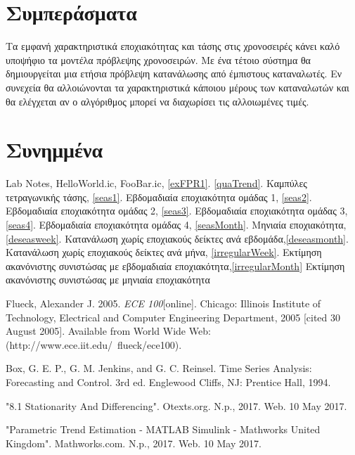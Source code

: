 \documentclass[a4paper, 11pt]{article}
\begin{document}
\section{Συμπεράσματα}
Τα εμφανή χαρακτηριστικά εποχιακότητας και τάσης στις χρονοσειρές κάνει καλό υποψήφιο τα μοντέλα πρόβλεψης χρονοσειρών. Με ένα τέτοιο σύστημα θα δημιουργείται μια ετήσια πρόβλεψη κατανάλωσης από έμπιστους καταναλωτές. Εν συνεχεία θα αλλοιώνονται τα χαρακτηριστικά κάποιου μέρους των καταναλωτών και θα ελέγχεται αν ο αλγόριθμος μπορεί να διαχωρίσει τις αλλοιωμένες τιμές.

\section*{Συνημμένα}
\ifx
Lab Notes, HelloWorld.ic, FooBar.ic,
\ref{exFPR1}.
\fi %
\ref{quaTrend}. Καμπύλες τετραγωνικής τάσης, \ref{seas1}. Εβδομαδιαία εποχιακότητα ομάδας 1, \ref{seas2}. Εβδομαδιαία εποχιακότητα ομάδας 2, \ref{seas3}. Εβδομαδιαία εποχιακότητα ομάδας 3, \ref{seas4}. Εβδομαδιαία εποχιακότητα ομάδας 4, \ref{seasMonth}. Μηνιαία εποχιακότητα,  \ref{deseasweek}. Κατανάλωση χωρίς εποχιακούς δείκτες ανά εβδομάδα,\ref{deseasmonth}. Κατανάλωση χωρίς εποχιακούς δείκτες ανά μήνα, \ref{irregularWeek}. Εκτίμηση ακανόνιστης συνιστώσας με εβδομαδιαία εποχιακότητα,\ref{irregularMonth} Εκτίμηση ακανόνιστης συνιστώσας με μηνιαία εποχιακότητα
\begin{thebibliography}{9}
\ifx
{}  Flueck, Alexander J. 2005. \emph{ECE 100}[online]. Chicago: Illinois Institute of Technology, Electrical and Computer Engineering Department, 2005 [cited 30
August 2005]. Available from World Wide Web: (http://www.ece.iit.edu/~flueck/ece100).
\fi

 Box, G. E. P., G. M. Jenkins, and G. C. Reinsel. Time Series Analysis: Forecasting and Control. 3rd ed. Englewood Cliffs, NJ: Prentice Hall, 1994.

 "8.1 Stationarity And Differencing". Otexts.org. N.p., 2017. Web. 10 May 2017.

 "Parametric Trend Estimation - MATLAB Simulink - Mathworks United Kingdom". Mathworks.com. N.p., 2017. Web. 10 May 2017.
\end{thebibliography}
\end{document}

